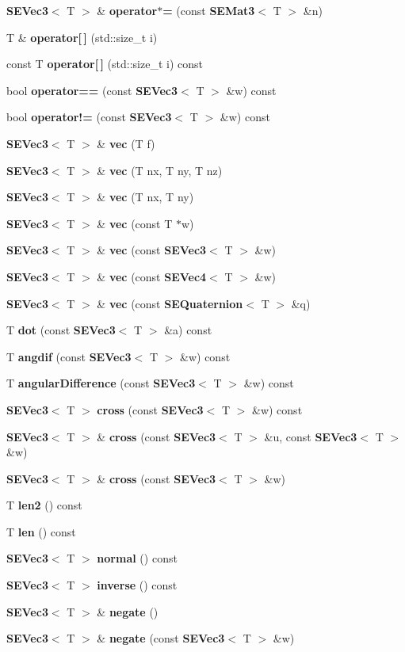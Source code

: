 \begin{DoxyCompactItemize}
\item 
{\bf S\+E\+Vec3}$<$ T $>$ \& {\bf operator$\ast$=} (const {\bf S\+E\+Mat3}$<$ T $>$ \&n)
\item 
T \& {\bf operator[$\,$]} (std\+::size\+\_\+t i)
\item 
const T {\bf operator[$\,$]} (std\+::size\+\_\+t i) const 
\item 
bool {\bf operator==} (const {\bf S\+E\+Vec3}$<$ T $>$ \&w) const 
\item 
bool {\bf operator!=} (const {\bf S\+E\+Vec3}$<$ T $>$ \&w) const 
\item 
{\bf S\+E\+Vec3}$<$ T $>$ \& {\bf vec} (T f)
\item 
{\bf S\+E\+Vec3}$<$ T $>$ \& {\bf vec} (T nx, T ny, T nz)
\item 
{\bf S\+E\+Vec3}$<$ T $>$ \& {\bf vec} (T nx, T ny)
\item 
{\bf S\+E\+Vec3}$<$ T $>$ \& {\bf vec} (const T $\ast$w)
\item 
{\bf S\+E\+Vec3}$<$ T $>$ \& {\bf vec} (const {\bf S\+E\+Vec3}$<$ T $>$ \&w)
\item 
{\bf S\+E\+Vec3}$<$ T $>$ \& {\bf vec} (const {\bf S\+E\+Vec4}$<$ T $>$ \&w)
\item 
{\bf S\+E\+Vec3}$<$ T $>$ \& {\bf vec} (const {\bf S\+E\+Quaternion}$<$ T $>$ \&q)
\item 
T {\bf dot} (const {\bf S\+E\+Vec3}$<$ T $>$ \&a) const 
\item 
T {\bf angdif} (const {\bf S\+E\+Vec3}$<$ T $>$ \&w) const 
\item 
T {\bf angular\+Difference} (const {\bf S\+E\+Vec3}$<$ T $>$ \&w) const 
\item 
{\bf S\+E\+Vec3}$<$ T $>$ {\bf cross} (const {\bf S\+E\+Vec3}$<$ T $>$ \&w) const 
\item 
{\bf S\+E\+Vec3}$<$ T $>$ \& {\bf cross} (const {\bf S\+E\+Vec3}$<$ T $>$ \&u, const {\bf S\+E\+Vec3}$<$ T $>$ \&w)
\item 
{\bf S\+E\+Vec3}$<$ T $>$ \& {\bf cross} (const {\bf S\+E\+Vec3}$<$ T $>$ \&w)
\item 
T {\bf len2} () const 
\item 
T {\bf len} () const 
\item 
{\bf S\+E\+Vec3}$<$ T $>$ {\bf normal} () const 
\item 
{\bf S\+E\+Vec3}$<$ T $>$ {\bf inverse} () const 
\item 
{\bf S\+E\+Vec3}$<$ T $>$ \& {\bf negate} ()
\item 
{\bf S\+E\+Vec3}$<$ T $>$ \& {\bf negate} (const {\bf S\+E\+Vec3}$<$ T $>$ \&w)

\end{DoxyCompactItemize}

